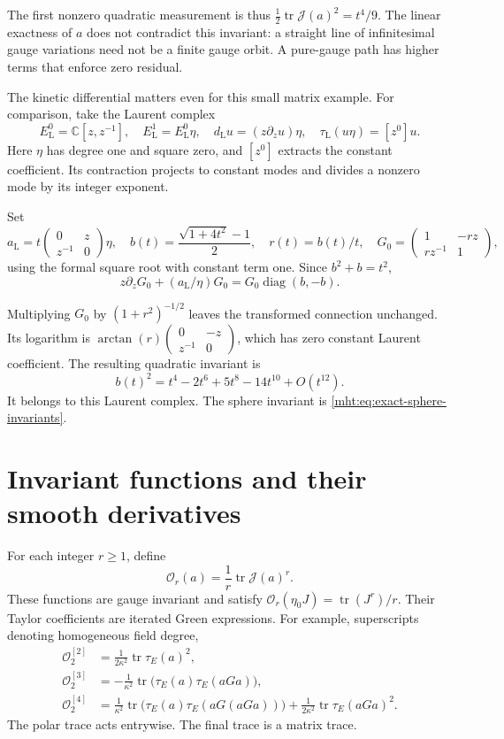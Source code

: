 The first nonzero quadratic measurement is thus
$\frac12\operatorname{tr}\mathcal J(a)^2=t^4/9$.
The linear exactness of $a$ does not contradict this invariant:
a straight line of infinitesimal gauge variations need not be a finite
gauge orbit. A pure-gauge path has higher terms that enforce zero
residual.

The kinetic differential matters even for this small matrix example.
For comparison, take the Laurent complex
\[
 E_{\mathrm L}^0=\mathbb C[z,z^{-1}],\quad
 E_{\mathrm L}^1=E_{\mathrm L}^0\eta,\quad
 d_{\mathrm L}u=(z\partial_zu)\eta,\quad
 \tau_{\mathrm L}(u\eta)=[z^0]u.
\]
Here $\eta$ has degree one and square zero, and $[z^0]$ extracts the
constant coefficient. Its contraction projects to constant modes and
divides a nonzero mode by its integer exponent.

Set
\[
 a_{\mathrm L}=t\begin{pmatrix}0&z\\z^{-1}&0\end{pmatrix}\eta,\quad
 b(t)=\frac{\sqrt{1+4t^2}-1}{2},\quad r(t)=b(t)/t,\quad
 G_0=\begin{pmatrix}1&-rz\\rz^{-1}&1\end{pmatrix},
\]
using the formal square root with constant term one. Since
$b^2+b=t^2$,
\[
 z\partial_zG_0+(a_{\mathrm L}/\eta)G_0
       =G_0\operatorname{diag}(b,-b).
\]

Multiplying $G_0$ by $(1+r^2)^{-1/2}$ leaves the transformed connection
unchanged. Its logarithm is
$\arctan(r)\left(\begin{smallmatrix}0&-z\\z^{-1}&0\end{smallmatrix}\right)$,
which has zero constant Laurent coefficient. The resulting quadratic
invariant is
\[
 b(t)^2=t^4-2t^6+5t^8-14t^{10}+O(t^{12}).
\]
It belongs to this Laurent complex. The sphere invariant is
\eqref{mht:eq:exact-sphere-invariants}.

\section{Invariant functions and their smooth derivatives}

For each integer $r\geq1$, define
\begin{equation}\label{mht:eq:invariant-insertion}
 \mathcal O_r(a)=\frac1r\operatorname{tr}\mathcal J(a)^r.
\end{equation}
These functions are gauge invariant and satisfy
$\mathcal O_r(\eta_0J)=\operatorname{tr}(J^r)/r$.
Their Taylor coefficients are iterated Green expressions. For example,
superscripts denoting homogeneous field degree,
\begin{align*}
 \mathcal O_2^{[2]}&=\frac1{2\kappa^2}\operatorname{tr}\tau_E(a)^2,\\
 \mathcal O_2^{[3]}&=-\frac1{\kappa^2}
              \operatorname{tr}\bigl(\tau_E(a)\tau_E(aGa)\bigr),\\
 \mathcal O_2^{[4]}&=\frac1{\kappa^2}
              \operatorname{tr}\bigl(\tau_E(a)\tau_E(aG(aGa))\bigr)
              +\frac1{2\kappa^2}\operatorname{tr}\tau_E(aGa)^2.
\end{align*}
The polar trace acts entrywise. The final trace is a matrix trace.

